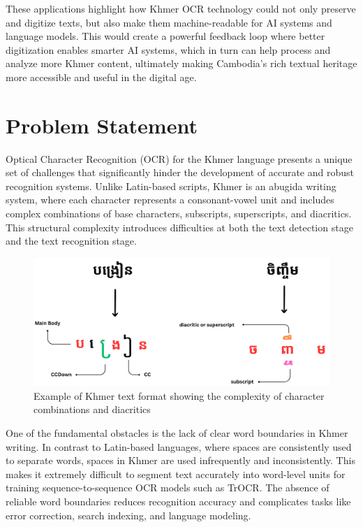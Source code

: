 These applications highlight how Khmer OCR technology could not only preserve and digitize texts, but also make them machine-readable for AI systems and language models. This would create a powerful feedback loop where better digitization enables smarter AI systems, which in turn can help process and analyze more Khmer content, ultimately making Cambodia's rich textual heritage more accessible and useful in the digital age.


\section{Problem Statement}
\label{sec:problem}

Optical Character Recognition (OCR) for the Khmer language presents a unique set of challenges that significantly hinder the development of accurate and robust recognition systems. Unlike Latin-based scripts, Khmer is an abugida writing system, where each character represents a consonant-vowel unit and includes complex combinations of base characters, subscripts, superscripts, and diacritics. This structural complexity introduces difficulties at both the text detection stage and the text recognition stage.
\begin{figure}[ht]
    \centering
    \includegraphics[width=\textwidth]{figures/example_of_text_format.png}
    \caption{Example of Khmer text format showing the complexity of character combinations and diacritics}
    \label{fig:text_format}
\end{figure}

One of the fundamental obstacles is the lack of clear word boundaries in Khmer writing. In contrast to Latin-based languages, where spaces are consistently used to separate words, spaces in Khmer are used infrequently and inconsistently. This makes it extremely difficult to segment text accurately into word-level units for training sequence-to-sequence OCR models such as TrOCR. The absence of reliable word boundaries reduces recognition accuracy and complicates tasks like error correction, search indexing, and language modeling.

